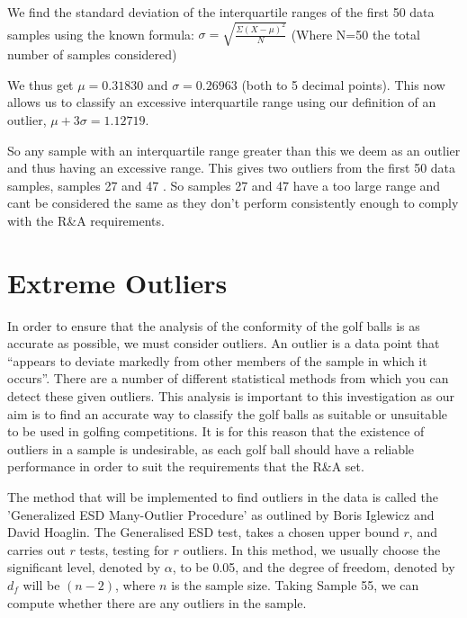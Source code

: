 \documentclass[11pt]{article}
\begin{document}
We find the standard deviation of the interquartile ranges of the first 50 data samples using the known formula:
$\sigma =\sqrt{\frac{\Sigma(X-\mu)^2}{N}}$
(Where N=50 the total number of samples considered) 

We thus get $\mu=0.31830$ and $\sigma=0.26963$ (both to 5 decimal points).
This now allows us to classify an excessive interquartile range using our definition of an outlier, $ \mu+3\sigma=1.12719 $.

So any sample with an interquartile range greater than this we deem as an outlier and thus having an excessive range. This gives two outliers from the first 50 data samples, samples 27 and 47 . So samples 27 and 47 have a too large range and cant be considered the same as they don’t perform consistently enough to comply with the R\&A requirements.


\section{Extreme Outliers}


In order to ensure that the analysis of the conformity of the golf balls is as accurate as possible, we must consider outliers. An outlier is a data point that “appears to deviate markedly from other members of the sample in which it occurs”.\cite{Frank_Grubbs} There are a number of different statistical methods from which you can detect these given outliers. This analysis is important to this investigation as our aim is to find an accurate way to classify the golf balls as suitable or unsuitable to be used in golfing competitions. It is for this reason that the existence of outliers in a sample is undesirable, as each golf ball should have a reliable performance in order to suit the requirements that the R\&A set.

The method that will be implemented to find outliers in the data is called the 'Generalized ESD Many-Outlier Procedure' as outlined by Boris Iglewicz and David Hoaglin.\cite{Outliers} The Generalised ESD test, takes a chosen upper bound $r$, and carries out $r$ tests, testing for $r$ outliers. In this method, we usually choose the significant level, denoted by $\alpha$, to be 0.05, and the degree of freedom, denoted by $d_f$ will be $(n-2)$, where $n$ is the sample size.\cite{Zmuk}
Taking Sample 55, we can compute whether there are any outliers in the sample. 
\end{document}
